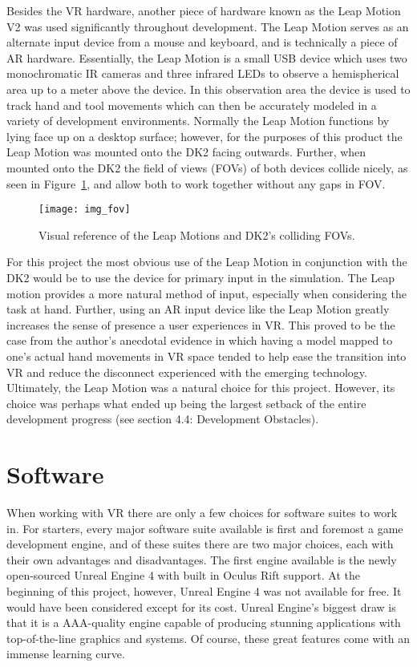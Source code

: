 Besides the VR hardware, another piece of hardware known as the Leap Motion V2 was used significantly throughout development. The Leap Motion serves as an alternate input device from a mouse and keyboard, and is technically a piece of AR hardware. Essentially, the Leap Motion is a small USB device which uses two monochromatic IR cameras and three infrared LEDs to observe a hemispherical area up to a meter above the device. In this observation area the device is used to track hand and tool movements which can then be accurately modeled in a variety of development environments. Normally the Leap Motion functions by lying face up on a desktop surface; however, for the purposes of this product the Leap Motion was mounted onto the DK2 facing outwards. Further, when mounted onto the DK2 the field of views (FOVs) of both devices collide nicely, as seen in Figure~\ref{figure:f_fov}, and allow both to work together without any gaps in FOV.

\begin{figure}
  \centering
  \texttt{[image: img\_fov]}
  \caption{Visual reference of the Leap Motions and DK2's colliding FOVs.}
  \label{figure:f_fov}
\end{figure}

For this project the most obvious use of the Leap Motion in conjunction with the DK2 would be to use the device for primary input in the simulation. The Leap motion provides a more natural method of input, especially when considering the task at hand. Further, using an AR input device like the Leap Motion greatly increases the sense of presence a user experiences in VR. This proved to be the case from the author's anecdotal evidence in which having a model mapped to one's actual hand movements in VR space tended to help ease the transition into VR and reduce the disconnect experienced with the emerging technology. Ultimately, the Leap Motion was a natural choice for this project. However, its choice was perhaps what ended up being the largest setback of the entire development progress (see section 4.4: Development Obstacles).

\section{Software}
\label{sec:software}

When working with VR there are only a few choices for software suites to work in. For starters, every major software suite available is first and foremost a game development engine, and of these suites there are two major choices, each with their own advantages and disadvantages. The first engine available is the newly open-sourced Unreal Engine 4 with built in Oculus Rift support. At the beginning of this project, however, Unreal Engine 4 was not available for free. It would have been considered except for its cost. Unreal Engine's biggest draw is that it is a AAA-quality engine capable of producing stunning applications with top-of-the-line graphics and systems. Of course, these great features come with an immense learning curve.

